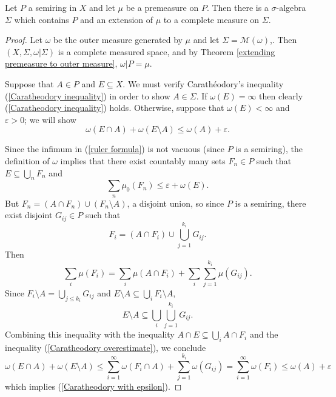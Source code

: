 \begin{theorem}\label{Caratheodory 2}
Let $P$ a semiring in $X$ and let $\mu$ be a premeasure on $P$.
Then there is a $\sigma$-algebra $\Sigma$ which contains $P$ and an extension of $\mu$ to a complete measure on $\Sigma$.
\end{theorem}
\begin{proof}
Let $\omega$ be the outer measure generated by $\mu$ and let $\Sigma = \mathcal M(\omega)$,.
Then $(X, \Sigma, \omega|\Sigma)$ is a complete measured space, and by Theorem \ref{extending premeasure to outer measure}, $\omega|P = \mu$.

Suppose that $A \in P$ and $E \subseteq X$. We must verify Carathéodory's inequality (\ref{Caratheodory inequality}) in order to show $A \in \Sigma$.
If $\omega(E) = \infty$ then clearly (\ref{Caratheodory inequality}) holds.
Otherwise, suppose that $\omega(E) < \infty$ and $\varepsilon > 0$; we will show
\begin{equation}
\label{Caratheodory with epsilon}
\omega(E \cap A) + \omega(E \setminus A) \leq \omega(A) + \varepsilon.
\end{equation}

Since the infimum in (\ref{ruler formula}) is not vacuous (since $P$ is a semiring), the definition of $\omega$ implies that there exist countably many sets $F_{n} \in P$ such that $E \subseteq \bigcup_{n} F_{n}$ and
\begin{equation}
\label{Caratheodory overestimate}
\sum_{n} \mu_{0}(F_{n}) \leq \varepsilon + \omega(E).
\end{equation}
But $F_{n} = (A \cap F_{n}) \cup (F_{n} \setminus A)$, a disjoint union, so since $P$ is a semiring, there exist disjoint $G_{ij} \in P$ such that
$$F_{i} = (A \cap F_{i}) \cup \bigcup_{j=1}^{k_{i}} G_{ij}.$$
Then
$$\sum_{i} \mu(F_{i}) = \sum_{i} \mu(A \cap F_{i}) + \sum_{i} \sum_{j=1}^{k_{i}} \mu(G_{ij}).$$
Since $F_{i} \setminus A = \bigcup_{j \leq k_{i}} G_{ij}$ and $E \setminus A \subseteq \bigcup_{i} F_{i} \setminus A$,
$$E \setminus A \subseteq \bigcup_{i} \bigcup_{j=1}^{k_{i}} G_{ij}.$$
Combining this inequality with the inequality $A \cap E \subseteq \bigcup_{i} A \cap F_{i}$ and the inequality (\ref{Caratheodory overestimate}), we conclude
$$\omega(E \cap A) + \omega(E \setminus A) \leq \sum_{i=1}^\infty \omega(F_{i} \cap A) + \sum_{j=1}^{k_{i}} \omega(G_{ij}) = \sum_{i=1}^\infty \omega(F_{i}) \leq \omega(A) + \varepsilon$$
which implies (\ref{Caratheodory with epsilon}).
\end{proof}

